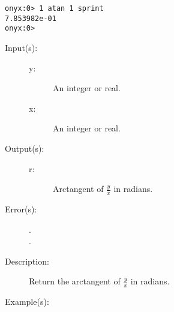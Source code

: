 \begin{description}
\begin{description}
\begin{verbatim}
onyx:0> 1 atan 1 sprint
7.853982e-01
onyx:0>
		\end{verbatim}
	\end{description}
\label{systemdict:atan2}
\item[{\onyxop{y x}{atan2}{r}}: ]
	\begin{description}\item[]
	\item[Input(s): ]
		\begin{description}\item[]
		\item[y: ]
			An integer or real.
		\item[x: ]
			An integer or real.
		\end{description}
	\item[Output(s): ]
		\begin{description}\item[]
		\item[r: ]
			Arctangent of $\frac{y}{x}$ in radians.
		\end{description}
	\item[Error(s): ]
		\begin{description}\item[]
		\item[.]
		\item[.]
		\end{description}
	\item[Description: ]
		Return the arctangent of $\frac{y}{x}$ in radians.
	\item[Example(s): ]\begin{verbatim}


\end{verbatim}
\end{description}
\end{description}
